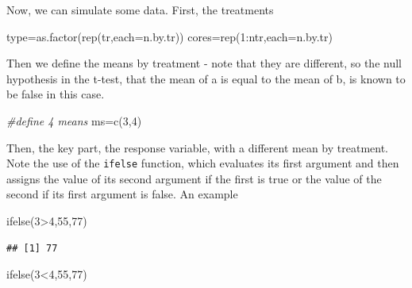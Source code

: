 \documentclass[
]{book}
\newenvironment{Shaded}{\begin{snugshade}}{\end{snugshade}}
\newcommand{\AttributeTok}[1]{\textcolor[rgb]{0.77,0.63,0.00}{#1}}
\newcommand{\CommentTok}[1]{\textcolor[rgb]{0.56,0.35,0.01}{\textit{#1}}}
\newcommand{\DecValTok}[1]{\textcolor[rgb]{0.00,0.00,0.81}{#1}}
\newcommand{\FunctionTok}[1]{\textcolor[rgb]{0.00,0.00,0.00}{#1}}
\newcommand{\NormalTok}[1]{#1}
\newcommand{\OtherTok}[1]{\textcolor[rgb]{0.56,0.35,0.01}{#1}}
\newcommand{\SpecialCharTok}[1]{\textcolor[rgb]{0.00,0.00,0.00}{#1}}
\begin{document}
Now, we can simulate some data. First, the treatments

\begin{Shaded}
\begin{Highlighting}[]
\NormalTok{type}\OtherTok{=}\FunctionTok{as.factor}\NormalTok{(}\FunctionTok{rep}\NormalTok{(tr,}\AttributeTok{each=}\NormalTok{n.by.tr))}
\NormalTok{cores}\OtherTok{=}\FunctionTok{rep}\NormalTok{(}\DecValTok{1}\SpecialCharTok{:}\NormalTok{ntr,}\AttributeTok{each=}\NormalTok{n.by.tr)}
\end{Highlighting}
\end{Shaded}

Then we define the means by treatment - note that they are different, so the null hypothesis in the t-test, that the mean of a is equal to the mean of b, is known to be false in this case.

\begin{Shaded}
\begin{Highlighting}[]
\CommentTok{\#define 4 means}
\NormalTok{ms}\OtherTok{=}\FunctionTok{c}\NormalTok{(}\DecValTok{3}\NormalTok{,}\DecValTok{4}\NormalTok{)}
\end{Highlighting}
\end{Shaded}

Then, the key part, the response variable, with a different mean by treatment. Note the use of the \texttt{ifelse} function, which evaluates its first argument and then assigns the value of its second argument if the first is true or the value of the second if its first argument is false. An example

\begin{Shaded}
\begin{Highlighting}[]
\FunctionTok{ifelse}\NormalTok{(}\DecValTok{3}\SpecialCharTok{\textgreater{}}\DecValTok{4}\NormalTok{,}\DecValTok{55}\NormalTok{,}\DecValTok{77}\NormalTok{)}
\end{Highlighting}
\end{Shaded}

\begin{verbatim}
## [1] 77
\end{verbatim}

\begin{Shaded}
\begin{Highlighting}[]
\FunctionTok{ifelse}\NormalTok{(}\DecValTok{3}\SpecialCharTok{\textless{}}\DecValTok{4}\NormalTok{,}\DecValTok{55}\NormalTok{,}\DecValTok{77}\NormalTok{)}
\end{Highlighting}
\end{Shaded}
\end{document}
